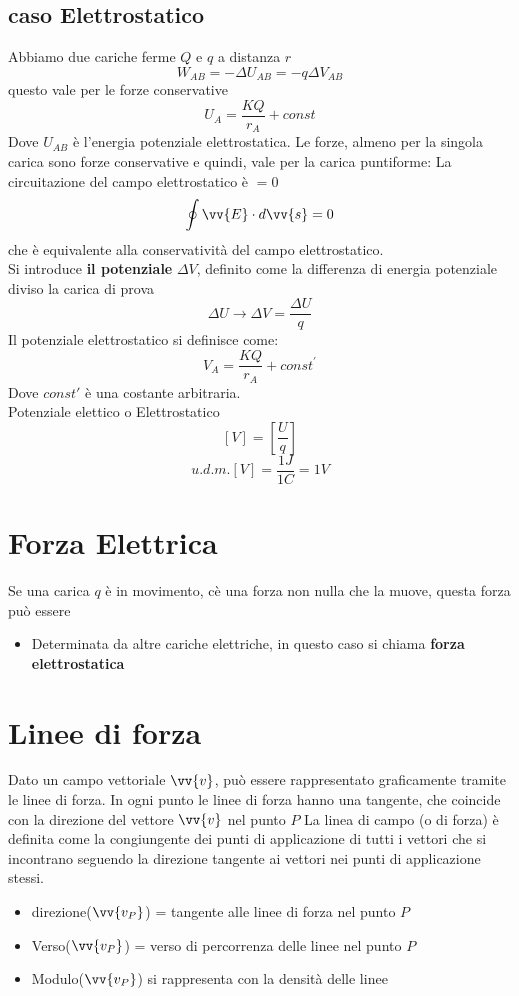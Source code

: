\documentclass[a4paper]{report}
\begin{document}
  \subsection{caso Elettrostatico}
  Abbiamo due cariche ferme $Q$ e $q$ a distanza $r$
  $$ W_{AB} = - \Delta U_{AB} = -q \Delta V_{AB}$$
  questo vale per le forze conservative
  $$ U_{A} = \frac{KQ}{r_A} + const $$
  Dove $U_{AB}$ è l'energia potenziale elettrostatica. Le forze, almeno per la singola carica sono forze conservative e quindi, vale per la carica puntiforme: La circuitazione del campo elettrostatico è $=0$
  $$ \oint \vv{E} \cdot d\vv{s} = 0 $$
  che è equivalente alla conservatività del campo elettrostatico.\\
  Si introduce \textbf{il potenziale} $\Delta V$, definito come la differenza di energia potenziale diviso la carica di prova
  $$ \Delta U \longrightarrow \Delta V = \frac{\Delta U}{q} $$
  Il potenziale elettrostatico si definisce come:
  $$ V_A = \frac{KQ}{r_A} + const^{'}$$
  Dove $const'$ è una costante arbitraria.\\
  Potenziale elettico o Elettrostatico
  $$ [V] = [\frac{U}{q}]$$
  $$u.d.m.[V] = \frac{1J}{1C} = 1V$$

  \section{Forza Elettrica}
  Se una carica $q$ è in movimento, cè una forza non nulla che la muove, questa forza può essere
  \begin{itemize}
    \item Determinata da altre cariche elettriche, in questo caso si chiama \textbf{forza elettrostatica}
  \end{itemize}

  \section{Linee di forza}
  Dato un campo vettoriale $\vv{v}$, può essere rappresentato graficamente tramite le linee di forza. In ogni punto le linee di forza hanno una tangente, che coincide con la direzione del vettore $\vv{v}$ nel punto $P$
  La linea di campo (o di forza) è definita come la congiungente dei punti di applicazione di tutti i vettori che si incontrano seguendo la direzione tangente ai vettori nei punti di applicazione stessi.
  \begin{itemize}
    \item direzione($\vv{v_P}$) = tangente alle linee di forza nel punto $P$
    \item Verso($\vv{v_P}$) = verso di percorrenza delle linee nel punto $P$
    \item Modulo($\vv{v_P}$) si rappresenta con la densità delle linee
  \end{itemize}
\end{document}
